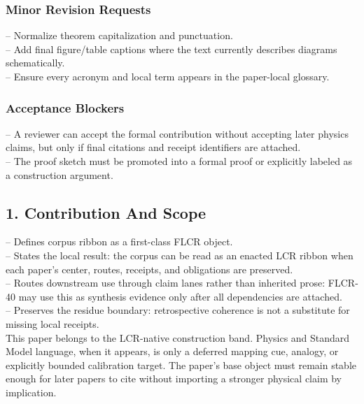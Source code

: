 \documentclass[11pt]{article}
\begin{document}
\subsubsection*{Minor Revision Requests}

\noindent{}-- Normalize theorem capitalization and punctuation.\\
\noindent{}-- Add final figure/table captions where the text currently describes diagrams schematically.\\
\noindent{}-- Ensure every acronym and local term appears in the paper-local glossary.\\

\subsubsection*{Acceptance Blockers}

\noindent{}-- A reviewer can accept the formal contribution without accepting later physics claims, but only if final citations and receipt identifiers are attached.\\
\noindent{}-- The proof sketch must be promoted into a formal proof or explicitly labeled as a construction argument.\\


\subsection*{1. Contribution And Scope}

\noindent{}-- Defines corpus ribbon as a first-class FLCR object.\\
\noindent{}-- States the local result: the corpus can be read as an enacted LCR ribbon when each paper's center, routes, receipts, and obligations are preserved.\\
\noindent{}-- Routes downstream use through claim lanes rather than inherited prose: FLCR-40 may use this as synthesis evidence only after all dependencies are attached.\\
\noindent{}-- Preserves the residue boundary: retrospective coherence is not a substitute for missing local receipts.\\

This paper belongs to the LCR-native construction band. Physics and Standard Model language, when it appears, is only a deferred mapping cue, analogy, or explicitly bounded calibration target. The paper's base object must remain stable enough for later papers to cite without importing a stronger physical claim by implication.
\end{document}
